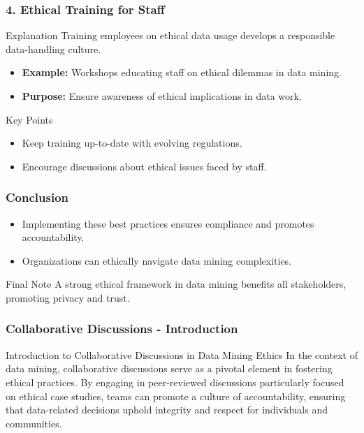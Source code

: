 \documentclass[aspectratio=169]{beamer}
\begin{document}
\begin{frame}[fragile]
    \frametitle{4. Ethical Training for Staff}
    \begin{block}{Explanation}
        Training employees on ethical data usage develops a responsible data-handling culture.
    \end{block}
    \begin{itemize}
        \item \textbf{Example:} Workshops educating staff on ethical dilemmas in data mining.
        \item \textbf{Purpose:} Ensure awareness of ethical implications in data work.
    \end{itemize}
    \begin{block}{Key Points}
        \begin{itemize}
            \item Keep training up-to-date with evolving regulations.
            \item Encourage discussions about ethical issues faced by staff.
        \end{itemize}
    \end{block}
\end{frame}

\begin{frame}[fragile]
    \frametitle{Conclusion}
    \begin{itemize}
        \item Implementing these best practices ensures compliance and promotes accountability.
        \item Organizations can ethically navigate data mining complexities.
    \end{itemize}
    \begin{block}{Final Note}
        A strong ethical framework in data mining benefits all stakeholders, promoting privacy and trust.
    \end{block}
\end{frame}

\begin{frame}[fragile]
    \frametitle{Collaborative Discussions - Introduction}
    \begin{block}{Introduction to Collaborative Discussions in Data Mining Ethics}
        In the context of data mining, collaborative discussions serve as a pivotal element in fostering ethical practices. By engaging in peer-reviewed discussions particularly focused on ethical case studies, teams can promote a culture of accountability, ensuring that data-related decisions uphold integrity and respect for individuals and communities.
    \end{block}
\end{frame}
\end{document}
